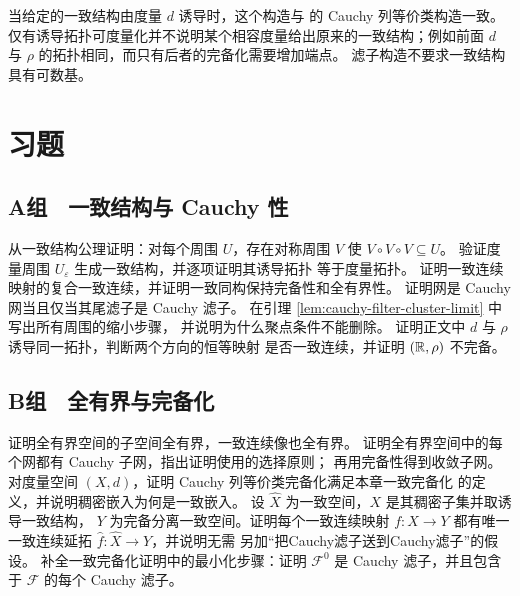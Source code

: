 当给定的一致结构由度量 \(d\) 诱导时，这个构造与
的 Cauchy 列等价类构造一致。
仅有诱导拓扑可度量化并不说明某个相容度量给出原来的一致结构；例如前面
\(d\) 与 \(\rho\) 的拓扑相同，而只有后者的完备化需要增加端点。
滤子构造不要求一致结构具有可数基。

\section*{习题}

\subsection*{A组　一致结构与 Cauchy 性}
\begin{enumerate}[label=\textbf{\thechapter.\arabic*.}]
 从一致结构公理证明：对每个周围 \(U\)，存在对称周围 \(V\) 使
 \(V\circ V\circ V\subseteq U\)。
 验证度量周围 \(U_\varepsilon\) 生成一致结构，并逐项证明其诱导拓扑
 等于度量拓扑。
 证明一致连续映射的复合一致连续，并证明一致同构保持完备性和全有界性。
 证明网是 Cauchy 网当且仅当其尾滤子是 Cauchy 滤子。
 在引理 \ref{lem:cauchy-filter-cluster-limit} 中写出所有周围的缩小步骤，
 并说明为什么聚点条件不能删除。
 证明正文中 \(d\) 与 \(\rho\) 诱导同一拓扑，判断两个方向的恒等映射
 是否一致连续，并证明 \((\mathbb{R},\rho)\) 不完备。
\end{enumerate}

\subsection*{B组　全有界与完备化}
\begin{enumerate}[label=\textbf{\thechapter.\arabic*.},resume]
 证明全有界空间的子空间全有界，一致连续像也全有界。
 证明全有界空间中的每个网都有 Cauchy 子网，指出证明使用的选择原则；
 再用完备性得到收敛子网。
 对度量空间 \((X,d)\)，证明 Cauchy 列等价类完备化满足本章一致完备化
 的定义，并说明稠密嵌入为何是一致嵌入。
 设 \(\widehat X\) 为一致空间，\(X\) 是其稠密子集并取诱导一致结构，
 \(Y\) 为完备分离一致空间。证明每个一致连续映射 \(f:X\to Y\)
 都有唯一一致连续延拓 \(\widehat f:\widehat X\to Y\)，并说明无需
 另加“把Cauchy滤子送到Cauchy滤子”的假设。
 补全一致完备化证明中的最小化步骤：证明 \(\mathcal F^0\) 是 Cauchy
 滤子，并且包含于 \(\mathcal F\) 的每个 Cauchy 滤子。
\end{enumerate}
